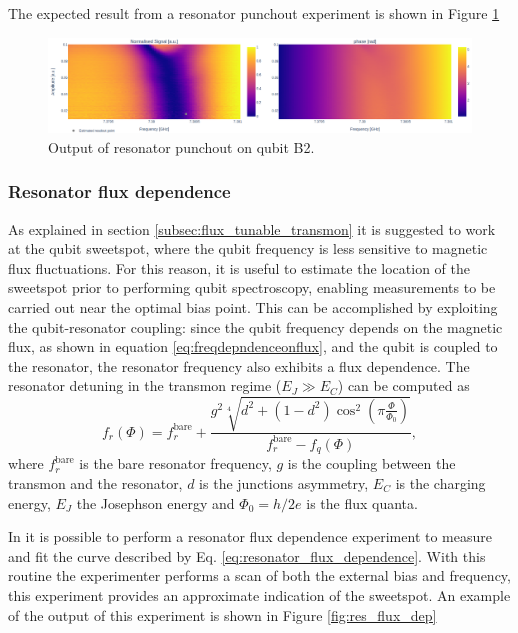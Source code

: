 The expected result from a resonator punchout experiment is shown in Figure \ref{fig:res_punchout}
\begin{figure}[h!]
    \centering
    \includegraphics[width=\textwidth]{figures/png/res_punchout.png}
    \caption{Output of resonator punchout on qubit B2.}
    \label{fig:res_punchout}
\end{figure}

\subsubsection{Resonator flux dependence}
As explained in section \ref{subsec:flux_tunable_transmon} it is suggested to work at the qubit sweetspot, where the qubit frequency is less sensitive to magnetic flux fluctuations.
For this reason, it is useful to estimate the location of the sweetspot prior to performing qubit spectroscopy, enabling measurements to be carried out near the optimal bias point. 
This can be accomplished by exploiting the qubit-resonator coupling: since the qubit frequency depends on the magnetic flux, as shown in equation \ref{eq:freqdepndenceonflux}, and the qubit is coupled to the resonator, the resonator frequency also exhibits a flux dependence. 
The resonator detuning in the transmon regime ($E_J \gg E_C$) can be computed as 
\begin{equation}\label{eq:resonator_flux_dependence}
    f_r(\Phi) = f_r^{\text{bare}} + \frac{g^2 \sqrt[4]{d^2 + (1 - d^2) \cos^2 \left( \pi \frac{\Phi}{\Phi_0} \right)}}{f_r^{\text{bare}} - f_q(\Phi)},
\end{equation}
where $f_r^{\text{bare}}$ is the bare resonator frequency, $g$ is the coupling between the transmon and the resonator, $d$ is the junctions asymmetry, $E_C$ is the charging energy, $E_J$ the Josephson energy and $\Phi_0 = h/2e$ is the flux quanta.

In \Qibocal it is possible to perform a resonator flux dependence experiment to measure and fit the curve described by Eq. \ref{eq:resonator_flux_dependence}.
With this routine the experimenter performs a scan of both the external bias and frequency, this experiment provides an approximate indication of the sweetspot.
An example of the output of this experiment is shown in Figure \ref{fig:res_flux_dep}

